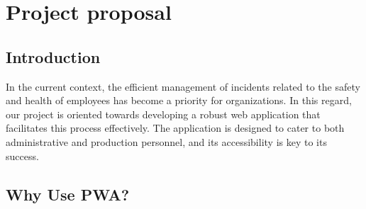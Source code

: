 \documentclass{report}
\begin{document}


\tableofcontents

\chapter{Project proposal}\label{Project proposal}
\section{Introduction}\label{intro}
In the current context, the efficient management of incidents related to the safety and health of employees has become a priority for organizations. In this regard, our project is oriented towards developing a robust web application that facilitates this process effectively. The application is designed to cater to both administrative and production personnel, and its accessibility is key to its success. 

\section{Why Use PWA?}\label{PWA}
\end{document}
